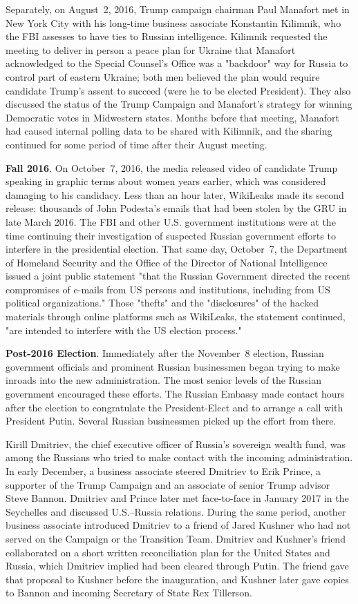 Separately, on August~2, 2016, Trump campaign chairman Paul Manafort met in New York City with his long-time business associate Konstantin Kilimnik, who the FBI assesses to have ties to Russian intelligence.
Kilimnik requested the meeting to deliver in person a peace plan for Ukraine that Manafort acknowledged to the Special Counsel's Office was a "backdoor" way for Russia to control part of eastern Ukraine; both men believed the plan would require candidate Trump's assent to succeed (were he to be elected President).
They also discussed the status of the Trump Campaign and Manafort's strategy for winning Democratic votes in Midwestern states.
Months before that meeting, Manafort had caused internal polling data to be shared with Kilimnik, and the sharing continued for some period of time after their August meeting.

\textbf{Fall 2016}.
On October~7, 2016, the media released video of candidate Trump speaking in graphic terms about women years earlier, which was considered damaging to his candidacy.
Less than an hour later, WikiLeaks made its second release: thousands of John Podesta's emails that had been stolen by the GRU in late March 2016.
The FBI and other U.S. government institutions were at the time continuing their investigation of suspected Russian government efforts to interfere in the presidential election.
That same day, October~7, the Department of Homeland Security and the Office of the Director of National Intelligence issued a joint public statement "that the Russian Government directed the recent compromises of e-mails from US persons and institutions, including from US political organizations."
Those "thefts" and the "disclosures" of the hacked materials through online platforms such as WikiLeaks, the statement continued, "are intended to interfere with the US election process."

\textbf{Post-2016 Election}.
Immediately after the November~8 election, Russian government officials and prominent Russian businessmen began trying to make inroads into the new administration.
The most senior levels of the Russian government encouraged these efforts.
The Russian Embassy made contact hours after the election to congratulate the President-Elect and to arrange a call with President Putin.
Several Russian businessmen picked up the effort from there.

Kirill Dmitriev, the chief executive officer of Russia's sovereign wealth fund, was among the Russians who tried to make contact with the incoming administration.
In early December, a business associate steered Dmitriev to Erik Prince, a supporter of the Trump Campaign and an associate of senior Trump advisor Steve Bannon.
Dmitriev and Prince later met face-to-face in January 2017 in the Seychelles and discussed U.S.--Russia relations.
During the same period, another business associate introduced Dmitriev to a friend of Jared Kushner who had not served on the Campaign or the Transition Team.
Dmitriev and Kushner's friend collaborated on a short written reconciliation plan for the United States and Russia, which Dmitriev implied had been cleared through Putin.
The friend gave that proposal to Kushner before the inauguration, and Kushner later gave copies to Bannon and incoming Secretary of State Rex Tillerson.

